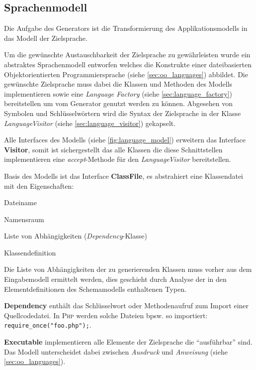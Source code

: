 \subsection{Sprachenmodell}
\label{sec:language_model}

Die Aufgabe des Generators ist die Transformierung des Applikationsmodells in das Modell der Zielsprache. 

Um die gewünschte Austauschbarkeit der Zielsprache zu gewährleisten wurde ein abstraktes Sprachenmodell entworfen welches die Konstrukte einer dateibasierten Objektorientierten Programmiersprache (siehe \cref{sec:oo_languages}) abbildet. 
Die gewünschte Zielsprache muss dabei die Klassen und Methoden des Modells implementieren sowie eine \emph{Language Factory} (siehe \cref{sec:language_factory}) bereitstellen um vom Generator genutzt werden zu können.
Abgesehen von Symbolen und Schlüsselwörtern wird die Syntax der Zielsprache in der Klasse \emph{LanguageVisitor} (siehe \cref{sec:language_visitor}) gekapselt. 

Alle Interfaces des Modells (siehe \cref{fig:language_model}) erweitern das Interface \textbf{Visitor}, somit ist sichergestellt das alle Klassen die diese Schnittstellen implementieren eine \emph{accept}-Methode für den \emph{LanguageVisitor} bereitstellen.

Basis des Modells ist das Interface \textbf{ClassFile}, es abstrahiert eine Klassendatei mit den Eigenschaften:
\begin{compactitem}
    \item Dateiname
    \item Namensraum
    \item Liste von Abhängigkeiten (\emph{Dependency}-Klasse)
    \item Klassendefinition
\end{compactitem}

Die Liste von Abhängigkeiten der zu generierenden Klassen muss vorher aus dem Eingabemodell ermittelt werden, dies geschieht durch Analyse der in den Elementdefinitionen des Schemamodells enthaltenen Typen. 

\textbf{Dependency} enthält das Schlüsselwort oder Methodenaufruf zum Import einer Quellcodedatei. In \textsc{Php} werden solche Dateien bpsw. so importiert: \texttt{require\_once("foo.php");}.

\textbf{Executable} implementieren alle Elemente der Zielsprache die \enquote{ausführbar} sind. Das Modell unterscheidet dabei zwischen \emph{Ausdruck} und \emph{Anweisung} (siehe \cref{sec:oo_languages}). 

